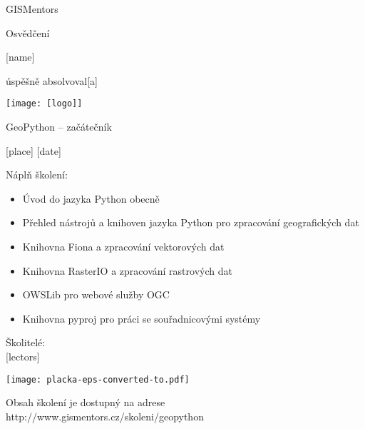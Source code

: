 \documentclass[12pt, a4paper]{letter}
\begin{document}
\pagestyle{empty}
\begin{center}

{\Large GISMentors}

{\Huge Osvědčení}

{\Large [name]}

úspěšně absolvoval[a]

\texttt{[image: [logo]]}

{\Large GeoPython -- začátečník}

[place] [date]
\end{center}

Náplň školení:

\begin{itemize}
    \item Úvod do jazyka Python obecně
    \item Přehled nástrojů a knihoven jazyka Python pro zpracování geografických dat
    \item Knihovna Fiona a zpracování vektorových dat
    \item Knihovna RasterIO a zpracování rastrových dat
    \item OWSLib pro webové služby OGC
    \item Knihovna pyproj pro práci se souřadnicovými systémy
\end{itemize}

\vfill
\parbox{7cm}{

    Školitelé: \\

    [lectors]

}
\hfill
\parbox{3cm}{
        \texttt{[image: placka-eps-converted-to.pdf]}
}

\vfill

\begin{center}
{\footnotesize Obsah školení je dostupný na adrese
http://www.gismentors.cz/skoleni/geopython}
\end{center}
\end{document}
